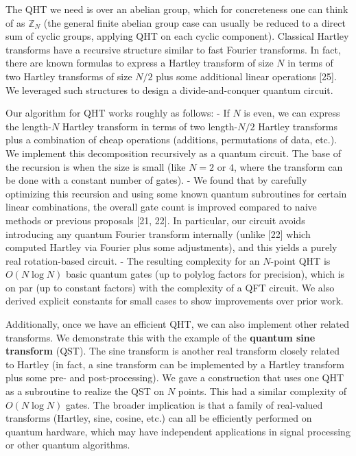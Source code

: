 \documentclass[11pt]{article}
\theoremstyle{definition}
\begin{document}
The QHT we need is over an abelian group, which for concreteness one can think of as $\mathbb{Z}_N$ (the general finite abelian group case can usually be reduced to a direct sum of cyclic groups, applying QHT on each cyclic component). Classical Hartley transforms have a recursive structure similar to fast Fourier transforms. In fact, there are known formulas to express a Hartley transform of size $N$ in terms of two Hartley transforms of size $N/2$ plus some additional linear operations [25]. We leveraged such structures to design a divide-and-conquer quantum circuit.

Our algorithm for QHT works roughly as follows:
- If $N$ is even, we can express the length-$N$ Hartley transform in terms of two length-$N/2$ Hartley transforms plus a combination of cheap operations (additions, permutations of data, etc.). We implement this decomposition recursively as a quantum circuit. The base of the recursion is when the size is small (like $N=2$ or $4$, where the transform can be done with a constant number of gates).
- We found that by carefully optimizing this recursion and using some known quantum subroutines for certain linear combinations, the overall gate count is improved compared to naive methods or previous proposals [21, 22]. In particular, our circuit avoids introducing any quantum Fourier transform internally (unlike [22] which computed Hartley via Fourier plus some adjustments), and this yields a purely real rotation-based circuit.
- The resulting complexity for an $N$-point QHT is $O(N \log N)$ basic quantum gates (up to polylog factors for precision), which is on par (up to constant factors) with the complexity of a QFT circuit. We also derived explicit constants for small cases to show improvements over prior work.

Additionally, once we have an efficient QHT, we can also implement other related transforms. We demonstrate this with the example of the \textbf{quantum sine transform} (QST). The sine transform is another real transform closely related to Hartley (in fact, a sine transform can be implemented by a Hartley transform plus some pre- and post-processing). We gave a construction that uses one QHT as a subroutine to realize the QST on $N$ points. This had a similar complexity of $O(N \log N)$ gates. The broader implication is that a family of real-valued transforms (Hartley, sine, cosine, etc.) can all be efficiently performed on quantum hardware, which may have independent applications in signal processing or other quantum algorithms.
\end{document}
